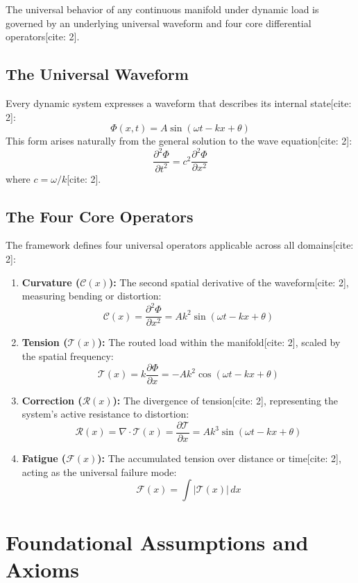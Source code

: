 \documentclass[11pt,book]{report}
\begin{document}
The universal behavior of any continuous manifold under dynamic load is governed by an underlying universal waveform and four core differential operators[cite: 2].

\section{The Universal Waveform}
Every dynamic system expresses a waveform that describes its internal state[cite: 2]:
$$\Phi(x,t) = A \sin(\omega t - kx + \theta)$$
This form arises naturally from the general solution to the wave equation[cite: 2]:
$$\frac{\partial^2 \Phi}{\partial t^2} = c^2 \frac{\partial^2 \Phi}{\partial x^2}$$
where $c = \omega / k$[cite: 2].

\section{The Four Core Operators}
The framework defines four universal operators applicable across all domains[cite: 2]:
\begin{enumerate}
    \item \textbf{Curvature ($\mathcal{C}(x)$):} The second spatial derivative of the waveform[cite: 2], measuring bending or distortion:
    $$\mathcal{C}(x) = \frac{\partial^2 \Phi}{\partial x^2} = Ak^2 \sin(\omega t - kx + \theta)$$
    \item \textbf{Tension ($\mathcal{T}(x)$):} The routed load within the manifold[cite: 2], scaled by the spatial frequency:
    $$\mathcal{T}(x) = k \frac{\partial \Phi}{\partial x} = -Ak^2 \cos(\omega t - kx + \theta)$$
    \item \textbf{Correction ($\mathcal{R}(x)$):} The divergence of tension[cite: 2], representing the system's active resistance to distortion:
    $$\mathcal{R}(x) = \nabla \cdot \mathcal{T}(x) = \frac{\partial \mathcal{T}}{\partial x} = Ak^3 \sin(\omega t - kx + \theta)$$
    \item \textbf{Fatigue ($\mathcal{F}(x)$):} The accumulated tension over distance or time[cite: 2], acting as the universal failure mode:
    $$\mathcal{F}(x) = \int |\mathcal{T}(x)| \, dx$$
\end{enumerate}

\chapter{Foundational Assumptions and Axioms}
\end{document}
